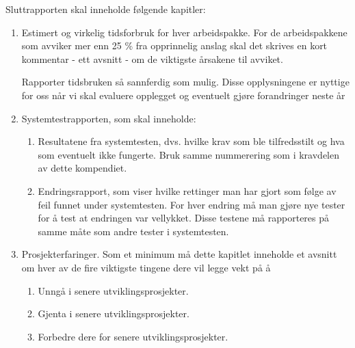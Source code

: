 Sluttrapporten skal inneholde følgende kapitler:

\begin{enumerate}

\item
Estimert og virkelig tidsforbruk for hver arbeidspakke. For de arbeidspakkene som avviker mer enn 25 \% fra opprinnelig anslag skal det skrives en kort kommentar - ett avsnitt - om de viktigste årsakene til avviket.

Rapporter tidsbruken så sannferdig som mulig. Disse opplysningene er nyttige for oss når vi skal evaluere opplegget og eventuelt gjøre forandringer neste år

\item
Systemtestrapporten, som skal inneholde:

\begin{enumerate}

\item
Resultatene fra systemtesten, dvs. hvilke krav som ble tilfredsstilt og hva som eventuelt ikke fungerte. Bruk samme nummerering som i kravdelen av dette kompendiet.

\item
Endringsrapport, som viser hvilke rettinger man har gjort som følge av feil funnet under systemtesten. For hver endring må man gjøre nye tester for å test at endringen var vellykket. Disse testene må rapporteres på samme måte som andre tester i systemtesten.

\end{enumerate}

\item
Prosjekterfaringer. Som et minimum må dette kapitlet inneholde et avsnitt om hver av de fire viktigste tingene dere vil legge vekt på å 

\begin{enumerate}

\item
Unngå i senere utviklingsprosjekter.

\item
Gjenta i senere utviklingsprosjekter.

\item
Forbedre dere for senere utviklingsprosjekter.

\end{enumerate}

\end{enumerate}